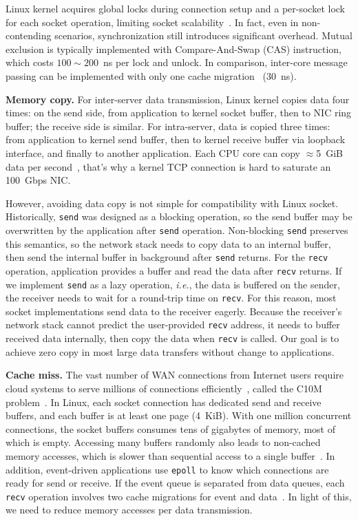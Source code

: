 Linux kernel acquires global locks during connection setup and a per-socket lock for each socket operation, limiting socket scalability~\cite{boyd2010analysis,han2012megapipe,lin2016scalable}. In fact, even in non-contending scenarios, synchronization still introduces significant overhead. Mutual exclusion is typically implemented with Compare-And-Swap (CAS) instruction, which costs $100\sim200$~ns per lock and unlock. In comparison, inter-core message passing can be implemented with only one cache migration~\cite{roghanchi2017ffwd} (30~ns).

\textbf{Memory copy.}
For inter-server data transmission, Linux kernel copies data four times: on the send side, from application to kernel socket buffer, then to NIC ring buffer; the receive side is similar. For intra-server, data is copied three times: from application to kernel send buffer, then to kernel receive buffer via loopback interface, and finally to another application. Each CPU core can copy $\approx$5~GiB data per second~\cite{panda2016netbricks}, that's why a kernel TCP connection is hard to saturate an 100~Gbps NIC.

However, avoiding data copy is not simple for compatibility with Linux socket. Historically, \texttt{send} was designed as a blocking operation, so the send buffer may be overwritten by the application after \texttt{send} operation.
Non-blocking \texttt{send} preserves this semantics, so the network stack needs to copy data to an internal buffer, then send the internal buffer in background after \texttt{send} returns.
For the \texttt{recv} operation, application provides a buffer and read the data after \texttt{recv} returns.
If we implement \texttt{send} as a lazy operation, \textit{i.e.}, the data is buffered on the sender, the receiver needs to wait for a round-trip time on \texttt{recv}.
For this reason, most socket implementations send data to the receiver eagerly. Because the receiver's network stack cannot predict the user-provided \texttt{recv} address, it needs to buffer received data internally, then copy the data when \texttt{recv} is called.
Our goal is to achieve zero copy in most large data transfers without change to applications.

\textbf{Cache miss.}
The vast number of WAN connections from Internet users require cloud systems to serve millions of connections efficiently~\cite{nishtala2013scaling,lin2016scalable,belay2017ix}, called the C10M problem~\cite{graham2013c10m}. In Linux, each socket connection has dedicated send and receive buffers, and each buffer is at least one page (4~KiB). With one million concurrent connections, the socket buffers consumes tens of gigabytes of memory, most of which is empty. Accessing many buffers randomly also leads to non-cached memory accesses, which is slower than sequential access to a single buffer~\cite{li2017kv}. In addition, event-driven applications use \texttt{epoll} to know which connections are ready for send or receive. If the event queue is separated from data queues, each \texttt{recv} operation involves two cache migrations for event and data~\cite{yasukata2016stackmap}. In light of this, we need to reduce memory accesses per data transmission.

